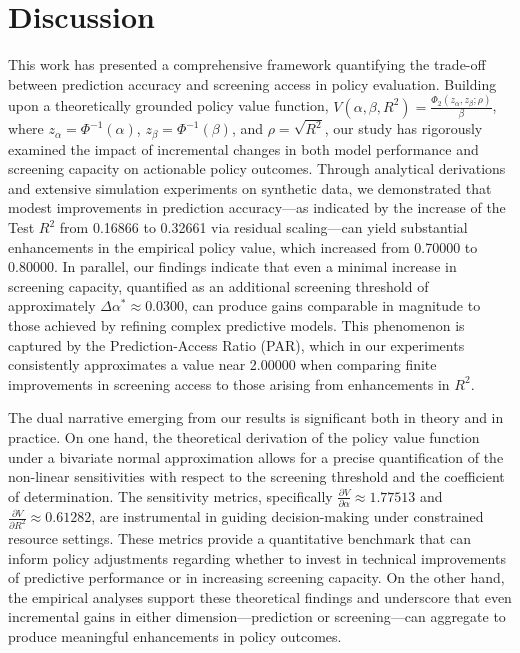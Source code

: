 \documentclass{article}
\begin{document}
\section{Discussion}
This work has presented a comprehensive framework quantifying the trade-off between prediction accuracy and screening access in policy evaluation. Building upon a theoretically grounded policy value function, \( V(\alpha,\beta,R^2)=\frac{\Phi_2(z_\alpha,z_\beta;\rho)}{\beta} \), where \( z_\alpha=\Phi^{-1}(\alpha) \), \( z_\beta=\Phi^{-1}(\beta) \), and \(\rho=\sqrt{R^2}\), our study has rigorously examined the impact of incremental changes in both model performance and screening capacity on actionable policy outcomes. Through analytical derivations and extensive simulation experiments on synthetic data, we demonstrated that modest improvements in prediction accuracy—as indicated by the increase of the Test \(R^2\) from 0.16866 to 0.32661 via residual scaling—can yield substantial enhancements in the empirical policy value, which increased from 0.70000 to 0.80000. In parallel, our findings indicate that even a minimal increase in screening capacity, quantified as an additional screening threshold of approximately \(\Delta\alpha^* \approx 0.0300\), can produce gains comparable in magnitude to those achieved by refining complex predictive models. This phenomenon is captured by the Prediction-Access Ratio (PAR), which in our experiments consistently approximates a value near 2.00000 when comparing finite improvements in screening access to those arising from enhancements in \( R^2 \).

The dual narrative emerging from our results is significant both in theory and in practice. On one hand, the theoretical derivation of the policy value function under a bivariate normal approximation allows for a precise quantification of the non-linear sensitivities with respect to the screening threshold and the coefficient of determination. The sensitivity metrics, specifically \(\frac{\partial V}{\partial \alpha}\approx 1.77513\) and \(\frac{\partial V}{\partial R^2}\approx 0.61282\), are instrumental in guiding decision-making under constrained resource settings. These metrics provide a quantitative benchmark that can inform policy adjustments regarding whether to invest in technical improvements of predictive performance or in increasing screening capacity. On the other hand, the empirical analyses support these theoretical findings and underscore that even incremental gains in either dimension—prediction or screening—can aggregate to produce meaningful enhancements in policy outcomes.
\end{document}
